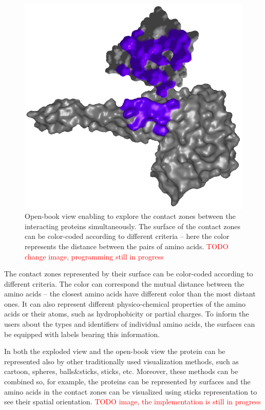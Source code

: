 \documentclass[journal]{vgtc}                %
\begin{document}
\begin{figure}[bt]
  \centering
  \includegraphics[width=0.8\columnwidth]{book.png}
  \caption{Open-book view enabling to explore the contact zones between the interacting proteins simultaneously. The surface of the contact zones can be color-coded according to different criteria -- here the color represents the distance between the pairs of amino acids. \textcolor{red}{TODO change image, programming still in progress}}
  \label{fig:book}
\end{figure}

The contact zones represented by their surface can be color-coded according to different criteria.
The color can correspond the mutual distance between the amino acids -- the closest amino acids have different color than the most distant ones.
It can also represent different physico-chemical properties of the amino acids or their atoms, such as hydrophobicity or partial charges.
To inform the users about the types and identifiers of individual amino acids, the surfaces can be equipped with labels bearing this information.

In both the exploded view and the open-book view the protein can be represented also by other traditionally used visualization methods, such as cartoon, spheres, balls\&sticks, sticks, etc.
Moreover, these methods can be combined so, for example, the proteins can be represented by surfaces and the amino acids in the contact zones can be visualized using sticks representation to see their spatial orientation. \textcolor{red}{TODO image, the implementation is still in progress}
\end{document}
